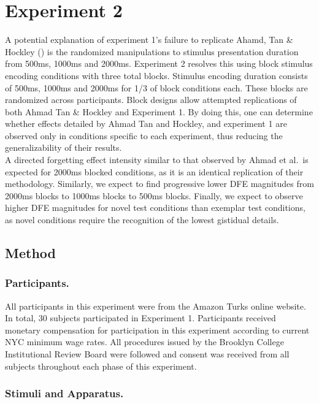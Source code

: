 \documentclass[
  english,
  man,floatsintext]{apa6}
\begin{document}
\hypertarget{experiment-2}{%
\section{Experiment 2}\label{experiment-2}}

A potential explanation of experiment 1's failure to replicate Ahamd, Tan \& Hockley () is the randomized manipulations to stimulus presentation duration from 500ms, 1000ms and 2000ms. Experiment 2 resolves this using block stimulus encoding conditions with three total blocks. Stimulus encoding duration consists of 500ms, 1000ms and 2000ms for 1/3 of block conditions each. These blocks are randomized across participants. Block designs allow attempted replications of both Ahmad Tan \& Hockley and Experiment 1. By doing this, one can determine whether effects detailed by Ahmad Tan and Hockley, and experiment 1 are observed only in conditions specific to each experiment, thus reducing the generalizability of their results.\\
A directed forgetting effect intensity similar to that observed by Ahmad et al.~is expected for 2000ms blocked conditions, as it is an identical replication of their methodology. Similarly, we expect to find progressive lower DFE magnitudes from 2000ms blocks to 1000ms blocks to 500ms blocks. Finally, we expect to observe higher DFE magnitudes for novel test conditions than exemplar test conditions, as novel conditions require the recognition of the lowest gistidual details.

\hypertarget{method-1}{%
\subsection{Method}\label{method-1}}

\hypertarget{participants.-1}{%
\subsubsection{Participants.}\label{participants.-1}}

All participants in this experiment were from the Amazon Turks online website. In total, 30 subjects participated in Experiment 1. Participants received monetary compensation for participation in this experiment according to current NYC minimum wage rates. All procedures issued by the Brooklyn College Institutional Review Board were followed and consent was received from all subjects throughout each phase of this experiment.

\hypertarget{stimuli-and-apparatus.-1}{%
\subsubsection{Stimuli and Apparatus.}\label{stimuli-and-apparatus.-1}}
\end{document}
